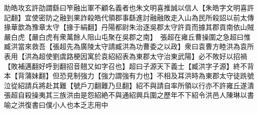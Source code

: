 助皓攻玄許劭謂繇曰笮融出軍不顧名義者也朱文明喜推誠以信人【朱皓字文明喜許記翻】宜使密防之融到果詐殺皓代領郡事繇進討融融敗走入山為民所殺詔以前太傳掾華歆為豫章太守【掾于絹翻】丹陽都尉朱治逐吳郡太守許貢而據其郡貢南依山賊嚴白虎【嚴白虎有衆萬餘人阻山屯聚在吳郡之南】　張超在雍丘曹操圍之急超曰惟臧洪當來救吾【張超先為廣陵太守請臧洪為功曹委之以政】衆曰袁曹方睦洪為袁所表用【洪為超使劉虞路梗因寓於袁紹紹表為東郡太守治東武陽】必不敗好以招禍【敗補邁翻好呼到翻招音翹又如字召也】超曰子源天下義士【臧洪字子源】終不背本【背蒲妺翻】但恐見制強力【強力謂強有力也】不相及耳洪時為東郡太守徒跣號泣從紹請兵將赴其難【號戶刀翻難乃旦翻】紹不與請自率所領以行亦不許雍丘遂潰張超自殺操夷其三族洪由是怨紹絶不與通紹興兵圍之歷年不下紹令洪邑人陳琳以書喻之洪復書曰僕小人也本乏志用中